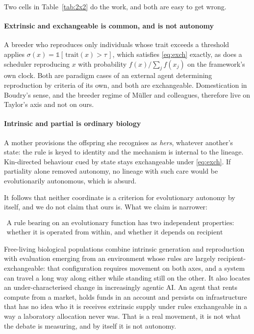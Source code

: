 \documentclass[review,3p,times]{elsarticle}
\begin{document}
Two cells in Table~\ref{tab:2x2} do the work, and both are easy to get wrong.

\paragraph{Extrinsic and exchangeable is common, and is not autonomy}
A breeder who reproduces only individuals whose trait exceeds a threshold
applies $\sigma(x)=\mathbb{1}[\,\mathrm{trait}(x)>\tau\,]$, which satisfies
\eqref{eq:exch} exactly, as does a scheduler reproducing $x$ with probability
$f(x)/\sum_j f(x_j)$ on the framework's own clock. Both are paradigm cases of
an external agent determining reproduction by criteria of its own, and both
are exchangeable. Domestication in Boudry's sense, and the breeder regime of
Müller and colleagues, therefore live on Taylor's axis and not on ours.

\paragraph{Intrinsic and partial is ordinary biology}
A mother provisions the offspring she recognises as \emph{hers}, whatever
another's state: the rule is keyed to identity and the mechanism is internal
to the lineage. Kin-directed behaviour cued by state stays exchangeable under
\eqref{eq:exch}. If partiality alone removed autonomy, no lineage with such
care would be evolutionarily autonomous, which is absurd.

It follows that neither coordinate is a criterion for evolutionary autonomy
by itself, and we do not claim that ours is. What we claim is narrower:

\begin{equation}
\boxed{
\begin{array}{c}
\text{A rule bearing on an evolutionary function has two independent properties:}\\[2pt]
\text{whether it is operated from within, and whether it depends on recipient identity.}
\end{array}}
\label{eq:twoaxes}
\end{equation}

Free-living biological populations combine intrinsic generation and
reproduction with evaluation emerging from an environment whose rules are
largely recipient-exchangeable: that configuration requires movement on both
axes, and a system can travel a long way along either while standing still on
the other. It also locates an under-characterised change in increasingly
agentic AI. An agent that rents compute from a market, holds funds in an
account and persists on infrastructure that has no idea who it is receives
extrinsic supply under rules exchangeable in a way a laboratory allocation
never was. That is a real movement, it is not what the debate is measuring,
and by itself it is not autonomy.
\end{document}
